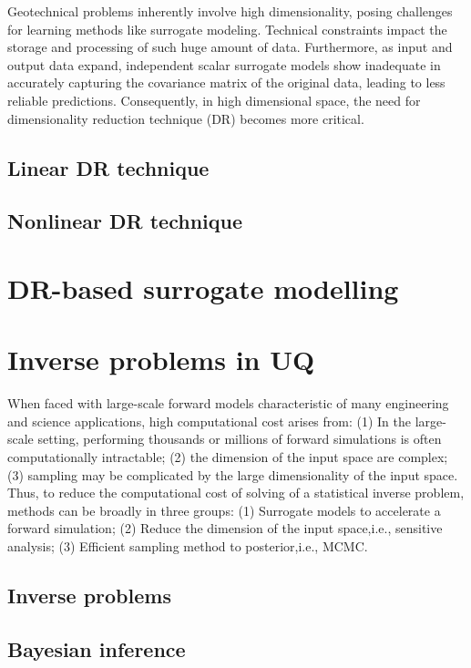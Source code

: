 Geotechnical problems inherently involve high dimensionality, posing challenges for learning methods like surrogate modeling. Technical constraints impact the storage and processing of such huge amount of data. Furthermore, as input and output data expand, independent scalar surrogate models show inadequate in accurately capturing the covariance matrix of the original data, leading to less reliable predictions. Consequently, in high dimensional space, the need for dimensionality reduction technique (DR) becomes more critical. 


\subsection{Linear DR technique}

\subsection{Nonlinear DR technique}

\section{DR-based surrogate modelling}

\section{Inverse problems in UQ}

When faced with large-scale forward models characteristic of many engineering and science applications, high computational cost arises from: (1) In the large-scale setting, performing thousands or millions of forward simulations is often computationally intractable; (2)  the dimension of the input space are complex; (3) sampling may be complicated by the large dimensionality of the input space. Thus, to reduce the computational cost of solving of a statistical inverse problem, methods can be broadly in three groups: (1) Surrogate models to accelerate a forward simulation; (2) Reduce the dimension of the input space,i.e., sensitive analysis; (3) Efficient sampling method to posterior,i.e., MCMC.



\subsection{Inverse problems}

\subsection{Bayesian inference}

